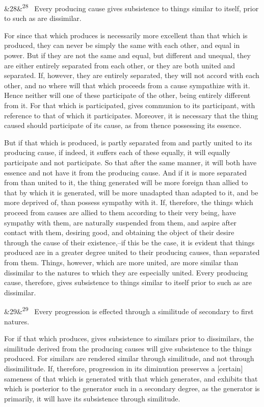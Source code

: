 \documentclass[12pt]{article}
\newcommand{\para}[1][]{\par\noindent\ifx&#1&\else\textsuperscript{\footnotesize #1}~\fi}
\begin{document}
\para[28] Every producing cause gives subsistence to things similar to itself, prior to such as are dissimilar.

For since that which produces is necessarily more excellent than that which is produced, they can never be simply the same with each other, and equal in power. But if they are not the same and equal, but different and unequal, they are either entirely separated from each other, or they are both united and separated. If, however, they are entirely separated, they will not accord with each other, and no where will that which proceeds from a cause sympathize with it. Hence neither will one of these participate of the other, being entirely different from it. For that which is participated, gives communion to its participant, with reference to that of which it participates. Moreover, it is necessary that the thing caused should participate of its cause, as from thence possessing its essence.

But if that which is produced, is partly separated from and partly united to its producing cause, if indeed, it suffers each of these equally, it will equally participate and not participate. So that after the same manner, it will both have essence and not have it from the producing cause. And if it is more separated from than united to it, the thing generated will be more foreign than allied to that by which it is generated, will be more unadapted than adapted to it, and be more deprived of, than possess sympathy with it. If, therefore, the things which proceed from causes are allied to them according to their very being, have sympathy with them, are naturally suspended from them, and aspire after contact with them, desiring good, and obtaining the object of their desire through the cause of their existence,--if this be the case, it is evident that things produced are in a greater degree united to their producing causes, than separated from them. Things, however, which are more united, are more similar than dissimilar to the natures to which they are especially united. Every producing cause, therefore, gives subsistence to things similar to itself prior to such as are dissimilar.

\para[29] Every progression is effected through a similitude of secondary to first natures.

For if that which produces, gives subsistence to similars prior to dissimilars, the similitude derived from the producing causes will give subsistence to the things produced. For similars are rendered similar through similitude, and not through dissimilitude. If, therefore, progression in its diminution preserves a [certain] sameness of that which is generated with that which generates, and exhibits that which is posterior to the generator such in a secondary degree, as the generator is primarily, it will have its subsistence through similitude.
\end{document}
